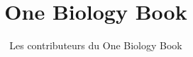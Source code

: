 \documentclass[11pt,a4paper,twoside,openany]{book}
\title{One Biology Book}
\author{Les contributeurs du One Biology Book}
\date{\bookdate}
\begin{document}
\frontmatter




\tableofcontents

\mainmatter



\appendix
\part{\omsolutionspart}


\backmatter
\printindex
\end{document}
